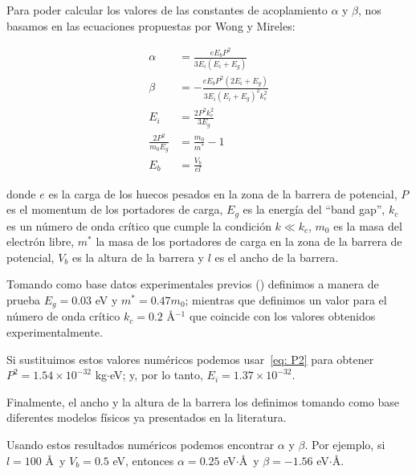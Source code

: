 Para poder calcular los valores de las constantes de acoplamiento $\alpha$ y $\beta$, nos basamos en las ecuaciones propuestas por Wong y Mireles\cite{WongUNAM2005}:

\begin{align}
    \alpha &= \frac{eE_b P^2}{3E_i\left( E_i + E_g \right)}\label{eq: alfa}\\
    \beta &= -\frac{eE_b P^2\left( 2E_i + E_g \right)}{3E_i\left( E_i + E_g \right)^2 k_c^2}\label{eq: beta}\\
    E_i &= \frac{2P^2 k_c^2}{3E_g} \label{eq: E_i}\\
    \frac{2P^2}{m_0 E_g} &= \frac{m_0}{m^*} - 1 \label{eq: P2}\\
    E_b &= \frac{V_b}{el} \label{eq: E_b}
\end{align}

\noindent donde $e$ es la carga de los huecos pesados en la zona de la barrera de potencial, $P$ es el momentum de los portadores de carga, $E_g$ es la energía del ``band gap'', $k_c$ es un número de onda crítico que cumple la condición $k \ll k_c$, $m_0$ es la masa del electrón libre, $m^*$ la masa de los portadores de carga en la zona de la barrera de potencial, $V_b$ es la altura de la barrera y $l$ es el ancho de la barrera.

Tomando como base datos experimentales previos (\cite{HuntSci2013, FuhrerSci2013, PallaBullMaterSci2016}) definimos a manera de prueba $E_g = 0.03$ eV y $m^* = 0.47m_0$; mientras que definimos un valor para el número de onda crítico $k_c = 0.2$ \AA$^{-1}$ que coincide con los valores obtenidos experimentalmente.

Si sustituimos estos valores numéricos podemos usar~\eqref{eq: P2} para obtener $P^2=1.54\times10^{-32}$ kg$\cdot$eV; y, por lo tanto, $E_i = 1.37\times10^{-32}$.

Finalmente, el ancho y la altura de la barrera los definimos tomando como base diferentes modelos físicos ya presentados en la literatura.

Usando estos resultados numéricos podemos encontrar $\alpha$ y $\beta$.
Por ejemplo, si $l=100$ \AA\, y $V_b = 0.5$ eV, entonces $\alpha = 0.25$ eV$\cdot$\AA\, y $\beta = -1.56$ eV$\cdot$\AA.


